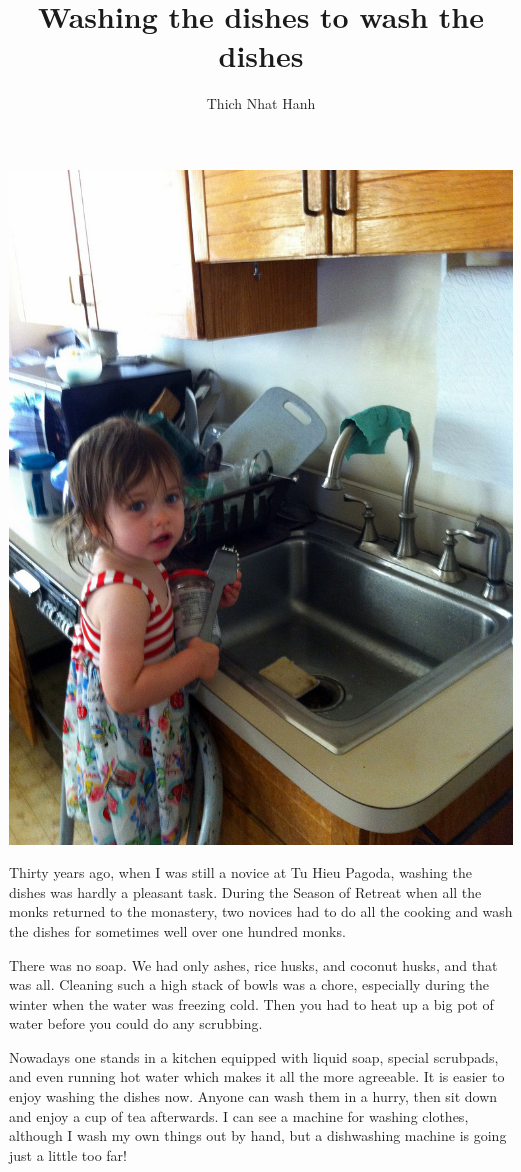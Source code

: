 \documentclass[a4paper,12pt]{article}
\title{Washing the dishes to wash the dishes}
\author{Thich Nhat Hanh}
\begin{document}
 \maketitle
\begin{center}
\includegraphics[scale=0.25]{washingdishes.jpg}
\end{center}
Thirty years ago, when I was still a novice at Tu Hieu Pagoda, washing the 
dishes was hardly a pleasant task. During the Season of Retreat when all the 
monks returned to the monastery, two novices had to do all the cooking and wash 
the dishes for sometimes well over one hundred monks.

There was no soap. We had only ashes, rice husks, and coconut husks, and that 
was all. Cleaning such a high stack of bowls was a chore, especially during the 
winter when the water was freezing cold. Then you had to heat up a big pot of 
water before you could do any scrubbing.

Nowadays one stands in a kitchen equipped with liquid soap, special scrubpads, 
and even running hot water which makes it all the more agreeable. It is easier 
to enjoy washing the dishes now. Anyone can wash them in a hurry, then sit down 
and enjoy a cup of tea afterwards. I can see a machine for washing clothes, 
although I wash my own things out by hand, but a dishwashing machine is going 
just a little too far!
\end{document}
